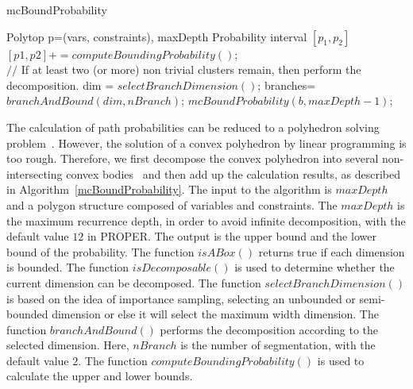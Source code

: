\documentclass[runningheads]{llncs}
\begin{document}
\begin{algorithm}	
	\caption{mcBoundProbability}	
	\label{mcBoundProbability}	
	\begin{algorithmic}[1]	
		\REQUIRE Polytop p=(vars, constraints), maxDepth		
		\ENSURE Probability interval $[p_1, p_2]$		
		\STATE $[p1,p2]+=computeBoundingProbability()$;	
		\ENDIF  \\		
		$//$ If at least two (or more) non trivial clusters remain, then perform the decomposition.  		
		\STATE dim = $selectBranchDimension()$;		
		\STATE branches= $branchAndBound(dim, nBranch)$;		
		\STATE $mcBoundProbability(b, maxDepth-1)$;		
		\ENDFOR
		\ENDIF
	\end{algorithmic}
\end{algorithm}

The calculation of path probabilities can be reduced to a polyhedron solving problem~\cite{Visser2012Green}. However, the solution of a convex polyhedron by linear programming is too rough. Therefore, we first decompose the convex polyhedron into several non-intersecting convex bodies~\cite{Bingsheng2020} and then add up the calculation results, as described in Algorithm~\ref{mcBoundProbability}. The input to the algorithm is $maxDepth$ and a polygon structure composed of variables and constraints. The $maxDepth$ is the maximum recurrence depth, in order to avoid infinite decomposition, with the default value $12$ in PROPER. The output is the upper bound and the lower bound of the probability. The function $isABox()$ returns true if each dimension is bounded. The function $isDecomposable()$ is used to determine whether the current dimension can be decomposed. The function $selectBranchDimension()$ is based on the idea of importance sampling, selecting an unbounded or semi-bounded dimension or else it will select the maximum width dimension. The function $branchAndBound()$  performs the decomposition according to the selected dimension. Here, $nBranch$ is the number of segmentation, with the default value $2$. The function $computeBoundingProbability()$ is used to calculate the upper and lower bounds. 
\end{document}
